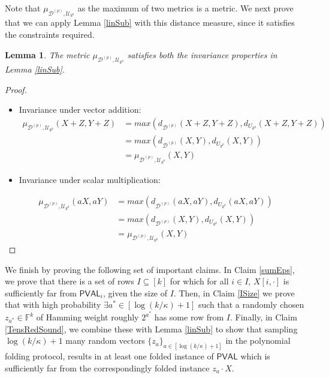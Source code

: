 \documentclass[10pt,a4paper]{article}
\newtheorem{lemma}[theorem]{Lemma}
\newcommand{\PVAL}{\mathsf{PVAL}}
\newcommand{\F}{\mathbb{F}}
\begin{document}
Note that $\mu_{\mathcal{D}^{(p)},\mathcal{U}_{k^{p}}}$ as the maximum of two metrics is a metric. We next prove that we can apply Lemma \ref{linSub} with this distance measure, since it satisfies the constraints required.
\begin{lemma}
The metric $\mu_{\mathcal{D}^{(p)},\mathcal{U}_{k^{p}}}$ satisfies both the invariance properties in Lemma \ref{linSub}.
\end{lemma}

\begin{proof}
\begin{itemize}
    \item Invariance under vector addition:
\[
\begin{split}
    \mu_{\mathcal{D}^{(p)},\mathcal{U}_{k^{p}}}(X+Z,Y+Z)&=max(d_{\mathcal{D}^{(p)}}(X+Z,Y+Z),d_{U_{k^{p}}}(X+Z,Y+Z))\\
    &=max(d_{\mathcal{D}^{(p)}}(X,Y),d_{U_{k^{p}}}(X,Y))\\
    &=\mu_{\mathcal{D}^{(p)},\mathcal{U}_{k^{p}}}(X,Y)
\end{split}
\]
    \item Invariance under scalar multiplication:
\end{itemize}
\[
\begin{split}
    \mu_{\mathcal{D}^{(p)},\mathcal{U}_{k^{p}}}(aX,aY)&=max(d_{\mathcal{D}^{(p)}}(aX,aY),d_{U_{k^{p}}}(aX,aY))\\
    &=max(d_{\mathcal{D}^{(p)}}(X,Y),d_{U_{k^{p}}}(X,Y))\\
    &=\mu_{\mathcal{D}^{(p)},\mathcal{U}_{k^{p}}}(X,Y)
\end{split}
\]
\end{proof}

We finish by proving the following set of important claims. In Claim \ref{sumEps}, we prove that there is a set of rows $I\subseteq [k]$ for which for all $i\in I$, $X[i,\cdot]$ is sufficiently far from $\PVAL_{i}$, given the size of $I$. Then, in Claim \ref{ISize} we prove that with high probability $\exists a^* \in [\log(k/\kappa)+1]$ such that a randomly chosen $z_{a^*} \in \F^k$ of Hamming weight roughly $2^{a^*}$ has some row from $I$. Finally, in Claim \ref{TensRedSound}, we combine these with Lemma \ref{linSub} to show that sampling $\log (k/\kappa) + 1$ many random vectors $\{z_a\}_{a \in [\log (k/\kappa)+1]}$ in the polynomial folding protocol, results in at least one folded instance of $\PVAL$ which is sufficiently far from the correspondingly folded instance $z_a \cdot X$. 
\end{document}
